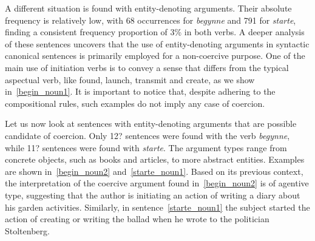 \documentclass{article}
\begin{document}
A different situation is found with entity-denoting arguments. Their absolute frequency is relatively low, with 68 occurrences for \emph{begynne} and 791 for \emph{starte}, finding a consistent frequency proportion of 3\% in both verbs.
A deeper analysis of these sentences uncovers that the use of entity-denoting arguments in syntactic canonical sentences is primarily employed for a non-coercive purpose. One of the main use of initiation verbs is to convey a sense that differs from the typical aspectual verb, like found, launch, transmit and create, as we show in~\ref{begin_noun1}. It is important to notice that, despite adhering to the compositional rules, such examples do not imply any case of coercion.
        \label{begin_noun1} %
        \z

Let us now look at sentences with entity-denoting arguments that are possible candidate of coercion. Only 12? sentences were found with the verb \emph{begynne}, while 11? sentences were found with \emph{starte}. The argument types range from concrete objects, such as books and articles, to more abstract entities. Examples are shown in~\ref{begin_noun2} and~\ref{starte_noun1}. Based on its previous context, the interpretation of the coercive argument found in~\ref{begin_noun2} is of agentive type, suggesting that the author is initiating an action of writing a diary about his garden activities. Similarly, in sentence~\ref{starte_noun1}
 the subject started the action of creating or writing the ballad when he wrote to the politician Stoltenberg.

        \ea \label{begin_noun2} %
\end{document}
